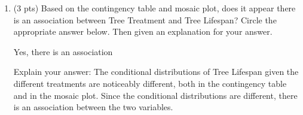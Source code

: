 \documentclass{article}
\begin{document}
\begin{enumerate}
\item (3 pts) Based on the contingency table and mosaic plot, does it appear there is an association between Tree Treatment and Tree Lifespan?  Circle the appropriate answer below.  Then given an explanation for your answer.

Yes, there is an association

Explain your answer:  The conditional distributions of Tree Lifespan given the different treatments are noticeably different, both in the contingency table and in the mosaic plot.  Since the conditional distributions are different, there is an association between the two variables.
\end{enumerate}
\end{document}
